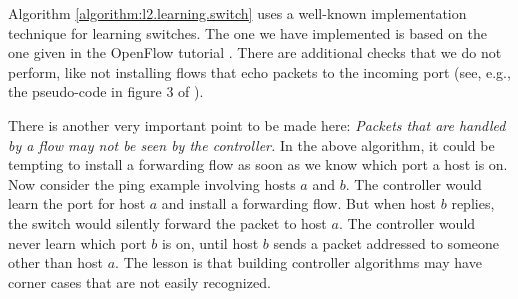 Algorithm \ref{algorithm:l2.learning.switch} uses a well-known
implementation technique for learning switches.
%
The one we have implemented is based on the one given in the OpenFlow
tutorial \cite{github:pox.tutorial}.
%
There are additional checks that we do not perform, like not installing
flows that echo packets to the incoming port (see, e.g., the pseudo-code in
figure 3 of \cite{Canini:2012:NWT:2228298.2228312}).

There is another very important point to be made here:
%
\textit{Packets that are handled by a flow may not be seen by the
  controller.}
%
In the above algorithm, it could be tempting to install a forwarding flow as
soon as we know which port a host is on.
%
Now consider the ping example involving hosts $a$ and $b$.
%
The controller would learn the port for host $a$ and install a forwarding
flow.
%
But when host $b$ replies, the switch would silently forward the packet to
host $a$.
%
The controller would never learn which port $b$ is on, until host $b$ sends
a packet addressed to someone other than host $a$.
%
The lesson is that building controller algorithms may have corner cases that
are not easily recognized.

